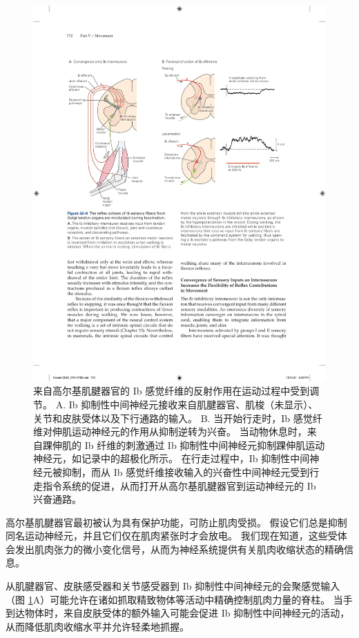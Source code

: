 \begin{figure}[htbp]
	\centering
	\includegraphics[width=0.9\linewidth]{chap32/fig_32_8}
	\caption{来自高尔基肌腱器官的 Ib 感觉纤维的反射作用在运动过程中受到调节。 A. Ib 抑制性中间神经元接收来自肌腱器官、肌梭（未显示）、关节和皮肤受体以及下行通路的输入。 B. 当开始行走时，Ib 感觉纤维对伸肌运动神经元的作用从抑制逆转为兴奋。 当动物休息时，来自踝伸肌的 Ib 纤维的刺激通过 Ib 抑制性中间神经元抑制踝伸肌运动神经元，如记录中的超极化所示。 在行走过程中，Ib 抑制性中间神经元被抑制，而从 Ib 感觉纤维接收输入的兴奋性中间神经元受到行走指令系统的促进，从而打开从高尔基肌腱器官到运动神经元的 Ib 兴奋通路。}
	\label{fig:32_8}
\end{figure}


高尔基肌腱器官最初被认为具有保护功能，可防止肌肉受损。 假设它们总是抑制同名运动神经元，并且它们仅在肌肉紧张时才会放电。 我们现在知道，这些受体会发出肌肉张力的微小变化信号，从而为神经系统提供有关肌肉收缩状态的精确信息。

从肌腱器官、皮肤感受器和关节感受器到 Ib 抑制性中间神经元的会聚感觉输入（图 \ref{fig:32_8}A）可能允许在诸如抓取精致物体等活动中精确控制肌肉力量的脊柱。 当手到达物体时，来自皮肤受体的额外输入可能会促进 Ib 抑制性中间神经元的活动，从而降低肌肉收缩水平并允许轻柔地抓握。

